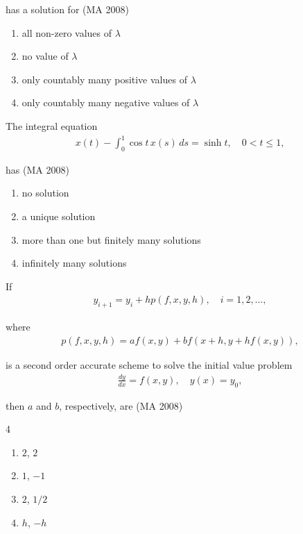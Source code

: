 has a solution for
\hfill (MA 2008)

\begin{enumerate}
    \item all non-zero values of $\lambda$
    \item no value of $\lambda$
    \item only countably many positive values of $\lambda$
    \item only countably many negative values of $\lambda$
\end{enumerate}


\item
The integral equation
\begin{align}
    x(t) - \int_0^1 \cos t \, x(s) \, ds = \sinh t, \quad 0 < t \leq 1,
\end{align}

has
\hfill (MA 2008)

\begin{enumerate}
    \item no solution
    \item a unique solution
    \item more than one but finitely many solutions
    \item infinitely many solutions
\end{enumerate}


\item
If 
\begin{align}
    y_{i+1} = y_i + h p(f,x,y,h), \quad i = 1,2,\ldots,
\end{align}

where
\begin{align}
    p(f,x,y,h) = a f(x,y) + b f(x+h, y + h f(x,y)),
\end{align}

is a second order accurate scheme to solve the initial value problem
\begin{align}
    \frac{dy}{dx} = f(x,y), \quad y(x) = y_0,
\end{align}

then $a$ and $b$, respectively, are
\hfill (MA 2008)
\begin{multicols}{4}
\begin{enumerate}
    \item $2$, $2$
    \item $1$, $-1$
    \item $2$, $1/2$
    \item $h$, $-h$
\end{enumerate}
\end{multicols}

